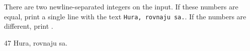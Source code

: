 




There are two newline-separated integers on the input. If these numbers are equal, print a single line with the text \texttt{Hura, rovnaju sa.}. If the numbers are different, print .

47
\vystup
Hura, rovnaju sa.
\koniec

